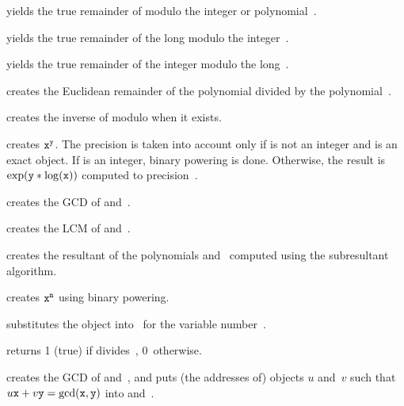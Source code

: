  yields the true remainder of 
modulo the integer or polynomial~.

 yields the true remainder of the
long  modulo the integer~.

 yields the true remainder of the
integer  modulo the long~.

 creates the Euclidean remainder of the
polynomial  divided by the polynomial~.

 creates the inverse of  modulo 
when it exists.

 creates ${\tt x}^{{\tt y}}$. The
precision  is taken into account only if  is not an integer
and  is an exact object. If  is an integer, binary powering
is done. Otherwise, the result is $\exp({\tt y}*\log({\tt x}))$ computed
to precision~.

 creates the GCD of  and~.

 creates the LCM of  and~.

 creates the resultant of the polynomials
 and~ computed using the subresultant algorithm.

 creates ${\tt x}^{{\tt n}}$ using
binary powering.

 substitutes the object 
into~ for the variable number~.

  returns 1 (true) if  divides~,
0~otherwise.

 creates the GCD of 
and~, and puts (the addresses of) objects $u$ and~$v$ such that
$u{\tt x}+v{\tt y}=\gcd({\tt x},{\tt y})$ into  and~.
\vfill\eject
